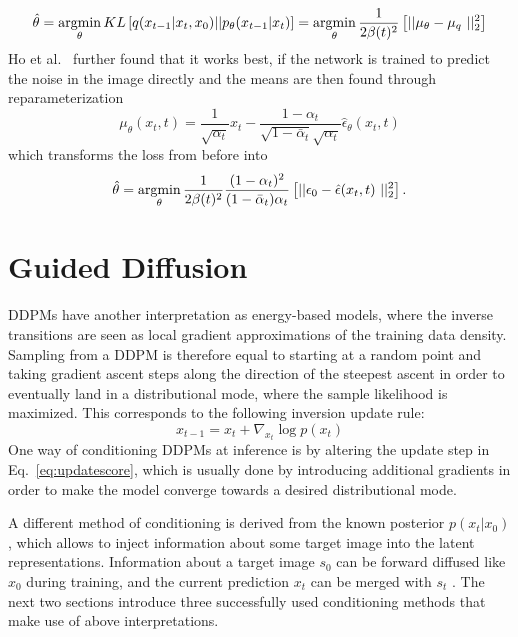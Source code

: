 \begin{equation}
    \hat{\theta} = \argmin_{\theta} KL \left[ q(x_{t-1}|x_{t},x_0) || p_{\theta}(x_{t-1}|x_{t}) \right] = \argmin_{\theta} \frac{1}{2\beta(t)^2} \left[ || \mu_{\theta} - \mu_{q} ||_2^2 \right]
\end{equation}
Ho et al.~\autocite{ho2020denoising} further found that it works best, if the network is trained to predict the noise in the image directly and the means are then found through reparameterization
\begin{equation}
    \mu_{\theta}(x_t,t) = \frac{1}{\sqrt{\alpha_t}}x_t - \frac{1-\alpha_t}{\sqrt{1-\bar{\alpha}_t}\sqrt{\alpha_t}}\hat{\epsilon}_{\theta}(x_t,t)
\end{equation}
which transforms the loss from before into~\autocite{luo2022understanding}
\begin{equation}
    \hat{\theta} = \argmin_{\theta}\frac{1}{2\beta(t)^2} \frac{(1-\alpha_t)^2}{(1-\bar{\alpha}_t)\alpha_t} \left[ || \epsilon_0 - \hat{\epsilon}(x_t, t)  ||_2^2 \right].
\end{equation}


\section{Guided Diffusion}
DDPMs have another interpretation as energy-based models, where the inverse transitions are seen as local gradient approximations of the training data density. Sampling from a DDPM is therefore equal to starting at a random point and taking gradient ascent steps along the direction of the steepest ascent in order to eventually land in a distributional mode, where the sample likelihood is maximized. This corresponds to the following inversion update rule:
\begin{equation}
    \label{eq:updatescore}
    x_{t-1} = x_{t} + \nabla_{x_t} \log p(x_t)
\end{equation}
One way of conditioning DDPMs at inference is by altering the update step in Eq.~\ref{eq:updatescore}, which is usually done by introducing additional gradients in order to make the model converge towards a desired distributional mode.

A different method of conditioning is derived from the known posterior $p(x_t|x_0)$, which allows to inject information about some target image into the latent representations. Information about a target image $s_0$ can be forward diffused like $x_0$ during training, and the current prediction $x_t$ can be merged with $s_t$
.
The next two sections introduce three successfully used conditioning methods that make use of above interpretations.
